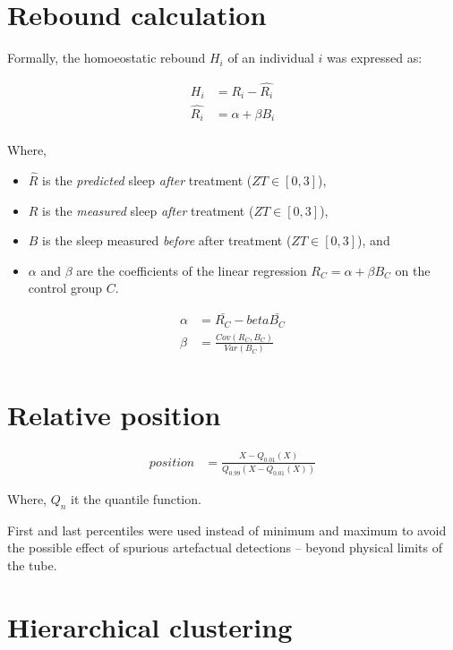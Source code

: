 \documentclass[a4paper,twoside,openright]{article}
\begin{document}
\section*{Rebound calculation}
Formally, the homoeostatic rebound $H_i$ of an individual $i$ was expressed as:

\begin{align*}
H_i &=  R_i - \hat{R_i} \\
\hat{R_i} &= \alpha + \beta{} B_i\\
\end{align*}


Where,
\begin{itemize}
	\item $\hat{R}$ is the \emph{predicted} sleep \emph{after} treatment ($ZT \in [0, 3]$),
	\item $R$ is the \emph{measured} sleep \emph{after} treatment ($ZT \in [0, 3]$),
	\item $B$ is the sleep measured \emph{before} after treatment ($ZT \in [0, 3]$), and
	\item $\alpha$ and $\beta$ are the coefficients of the linear regression $R_C = \alpha + \beta{B_C}$ on the control group $C$.
\end{itemize}

\begin{align*}
\alpha &=  \bar{R_C} - beta\bar{B_C} \\
\beta &= \frac{Cov(R_C, B_C)}{Var(B_C)}\\
\end{align*}


\section*{Relative position}

\begin{align*}
position &=  \frac{X - Q_{0.01}(X)}{Q_{0.99}(X - Q_{0.01}(X))}
\end{align*}

Where, $Q_n$  it the quantile function.

First and last percentiles were used instead of minimum and maximum to avoid the possible effect of spurious artefactual detections -- beyond physical limits of the tube.



\section*{Hierarchical clustering}
\end{document}
